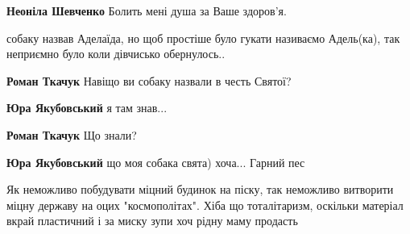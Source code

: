 \begin{itemize}
\begin{itemize}
\textbf{Неоніла Шевченко} Болить мені душа за Ваше здоров'я.

\end{itemize}

 
собаку назвав Аделаїда, но щоб простіше було гукати називаємо Адель(ка), так
неприємно було коли дівчисько обернулось..

\begin{itemize}
 
\textbf{Роман Ткачук} Навіщо ви собаку назвали в честь Святої?

 
\textbf{Юра Якубовський} я там знав...

 
\textbf{Роман Ткачук} Що знали?

 
\textbf{Юра Якубовський} що моя собака свята) хоча... Гарний пес
\end{itemize}


Як неможливо побудувати міцний будинок на піску, так неможливо витворити міцну
державу на оцих "космополітах". Хіба що тоталітаризм, оскільки матеріал вкрай
пластичний і за миску зупи хоч рідну маму продасть


\end{itemize}
